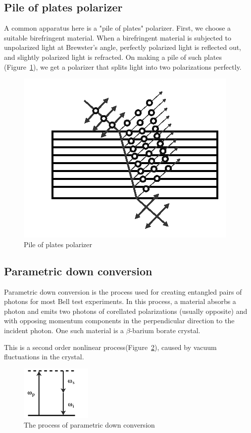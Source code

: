 \documentclass[10pt, twocolumn]{article}
\begin{document}
\subsection{Pile of plates polarizer}
A common apparatus here is a "pile of plates" polarizer. First, we choose a suitable birefringent material. When a birefringent material is subjected to unpolarized light at Brewster's angle, perfectly polarized light is reflected out, and slightly polarized light is refracted. On making a pile of such plates (Figure~\ref{fig:pop}), we get a polarizer that splits light into two polarizations perfectly.
\begin{figure}
\centering
\includegraphics[scale=0.4]{pileofplates}
\caption{Pile of plates polarizer}
\label{fig:pop}
\end{figure}
\subsection{Parametric down conversion}
Parametric down conversion is the process used for creating entangled pairs of photons for most Bell test experiments. In this process, a material absorbs a photon and emits two photons of corellated polarizations (usually opposite) and with opposing momentum components in the perpendicular direction to the incident photon. One such material is a $\beta$-barium borate crystal\cite{PhysRevLett.75.4337}. 

This is a second order nonlinear process(Figure~\ref{fig:pdc}), caused by vacuum fluctuations in the crystal.

\begin{figure}
\centering
\includegraphics[scale=0.7]{pdc}
\caption{The process of parametric down conversion}
\label{fig:pdc}
\end{figure}
\end{document}
